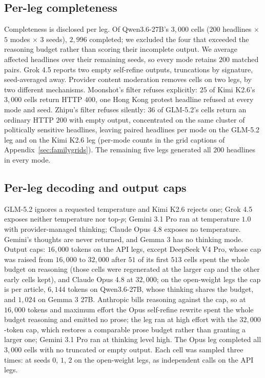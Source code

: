 \documentclass{article}
\begin{document}
\subsection{Per-leg completeness}
Completeness is disclosed per leg. Of Qwen3.6-27B's $3{,}000$ cells ($200$ headlines $\times$
$5$ modes $\times$ $3$ seeds), $2{,}996$ completed; we excluded the four that exceeded the
reasoning budget rather than scoring their incomplete output. We average affected headlines
over their remaining seeds, so every mode retains $200$ matched pairs. Grok 4.5 reports two
empty self-refine outputs, truncations by signature, seed-averaged away. Provider content
moderation removes cells on two legs, by two different mechanisms. Moonshot's filter refuses
explicitly: $25$ of Kimi K2.6's $3{,}000$ cells return HTTP $400$, one Hong Kong protest
headline refused at every mode and seed. Zhipu's filter refuses silently: $36$ of GLM-5.2's
cells return an ordinary HTTP $200$ with empty output, concentrated on the same cluster of
politically sensitive headlines, leaving  paired headlines per mode on the
GLM-5.2 leg and  on the Kimi K2.6 leg (per-mode counts in the grid
captions of Appendix~\ref{sec:familygrids}). The remaining five legs generated all $200$
headlines in every mode.

\subsection{Per-leg decoding and output caps}\label{sec:caps}
GLM-5.2 ignores a requested temperature and Kimi K2.6 rejects one; Grok 4.5 exposes neither
temperature nor top-$p$; Gemini 3.1 Pro ran at temperature $1.0$ with provider-managed thinking;
Claude Opus 4.8 exposes no temperature. Gemini's thoughts are never returned, and Gemma 3 has
no thinking mode. Output caps: $16{,}000$ tokens on the API legs, except DeepSeek V4 Pro, whose
cap was raised from $16{,}000$ to $32{,}000$ after $51$ of its first $513$ cells spent the whole
budget on reasoning (those cells were regenerated at the larger cap and the other early cells
kept), and Claude Opus 4.8 at $32{,}000$; on the open-weight legs the cap is per article, $6{,}144$ tokens
on Qwen3.6-27B, whose thinking shares the budget, and $1{,}024$ on Gemma 3 27B. Anthropic bills
reasoning against the cap, so at $16{,}000$ tokens and maximum effort the Opus self-refine rewrite
spent the whole budget reasoning and emitted no prose; the leg ran at high effort with the
$32{,}000$-token cap, which restores a comparable prose budget rather than granting a larger one;
Gemini 3.1 Pro ran at thinking level high. The Opus leg completed all $3{,}000$ cells with no
truncated or empty output. Each cell was sampled three times: at seeds $0$, $1$, $2$ on the open-weight
legs, as independent calls on the API legs.
\end{document}
